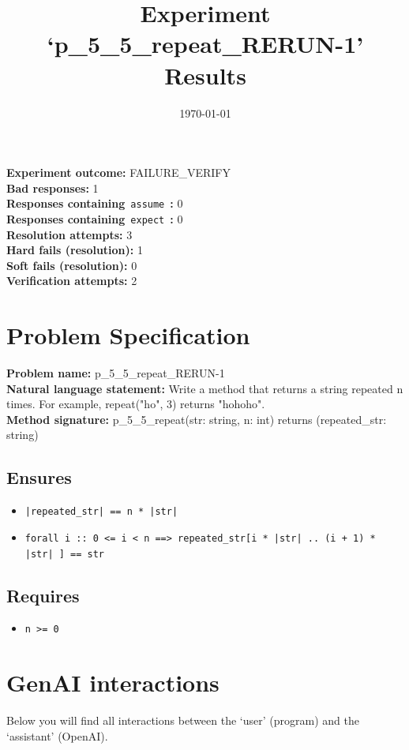 \documentclass{article}
\begin{document}
\title{Experiment `p\_5\_5\_repeat\_RERUN-1' Results}
\author{\today}
\date{}
\maketitle
\textbf{Experiment outcome: }FAILURE\_VERIFY
\\\textbf{Bad responses: }1
\\\textbf{Responses containing}~\texttt{assume}~\textbf{: }0
\\\textbf{Responses containing}~\texttt{expect}~\textbf{: }0
\\\textbf{Resolution attempts: }3
\\\textbf{Hard fails (resolution): }1
\\\textbf{Soft fails (resolution): }0
\\\textbf{Verification attempts: }2
\section*{Problem Specification}
\textbf{Problem name: }p\_5\_5\_repeat\_RERUN-1
\\\textbf{Natural language statement: }Write a method that returns a string repeated n times. For example, repeat("ho", 3) returns "hohoho".
\\\textbf{Method signature: }p\_5\_5\_repeat(str: string, n: int) returns (repeated\_str: string)
\subsection*{Ensures}
\begin{itemize}
\item \texttt{|repeated\_str| == n * |str|}
\item \texttt{forall i :: 0 <= i < n ==> repeated\_str[i * |str| .. (i + 1) * |str| ] == str}
\end{itemize}
\subsection*{Requires}
\begin{itemize}
\item \texttt{n >= 0}
\end{itemize}
\clearpage
\section*{GenAI interactions}
Below you will find all interactions between the `user' (program) and the `assistant' (OpenAI).
\end{document}

